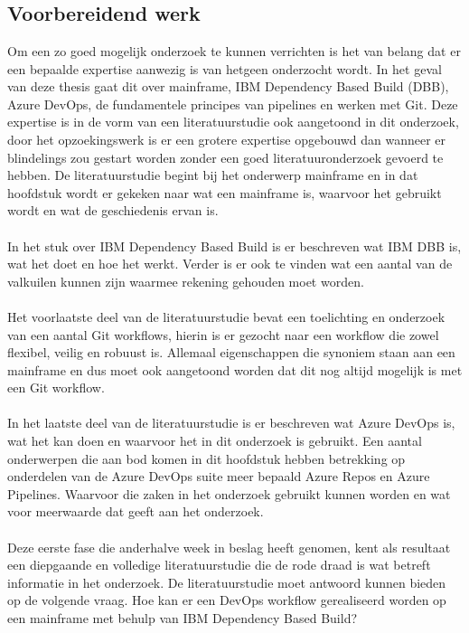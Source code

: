 
\chapter{}%
\label{ch:methodologie}

\section{Voorbereidend werk}
\label{sec:voorbereidend werk}
Om een zo goed mogelijk onderzoek te kunnen verrichten is het van belang dat er een bepaalde expertise aanwezig is van hetgeen onderzocht wordt. In het geval van deze thesis gaat dit over mainframe, IBM Dependency Based Build (DBB), Azure DevOps, de fundamentele principes van pipelines en werken met Git. Deze expertise is in de vorm van een literatuurstudie ook aangetoond in dit onderzoek, door het opzoekingswerk is er een grotere expertise opgebouwd dan wanneer er blindelings zou gestart worden zonder een goed literatuuronderzoek gevoerd te hebben. De literatuurstudie begint bij het onderwerp mainframe en in dat hoofdstuk wordt er gekeken naar wat een mainframe is, waarvoor het gebruikt wordt en wat de geschiedenis ervan is.
\\ \\
In het stuk over IBM Dependency Based Build is er beschreven wat IBM DBB is, wat het doet en hoe het werkt. 
Verder is er ook te vinden wat een aantal van de valkuilen kunnen zijn waarmee rekening gehouden moet worden.
\\ \\
Het voorlaatste deel van de literatuurstudie bevat een toelichting en onderzoek van een aantal Git workflows, hierin is er gezocht naar een workflow die zowel flexibel, veilig en robuust is.
Allemaal eigenschappen die synoniem staan aan een mainframe en dus moet ook aangetoond worden dat dit nog altijd mogelijk is met een Git workflow.
\\ \\
In het laatste deel van de literatuurstudie is er beschreven wat Azure DevOps is, wat het kan doen en waarvoor het in dit onderzoek is gebruikt.
Een aantal onderwerpen die aan bod komen in dit hoofdstuk hebben betrekking op onderdelen van de Azure DevOps suite meer bepaald Azure Repos en Azure Pipelines.
Waarvoor die zaken in het onderzoek gebruikt kunnen worden en wat voor meerwaarde dat geeft aan het onderzoek.
\\ \\
Deze eerste fase die anderhalve week in beslag heeft genomen, kent als resultaat een diepgaande en volledige literatuurstudie die de rode draad is wat betreft informatie in het onderzoek. De literatuurstudie moet antwoord kunnen bieden op de volgende vraag. Hoe kan er een DevOps workflow gerealiseerd worden op een mainframe met behulp van IBM Dependency Based Build?

